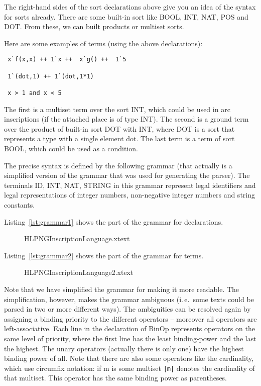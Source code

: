 The right-hand sides of the sort declarations above give you an idea of the
syntax for sorts already. There are some built-in sort like BOOL, INT, NAT, POS and
DOT. From these, we can built products or multiset sorts.

Here are some examples of terms (using the above declarations):
\begin{verbatim}
 x`f(x,x) ++ 1`x ++  x`g() ++  1`5
 
 1`(dot,1) ++ 1`(dot,1*1)
 
 x > 1 and x < 5 
\end{verbatim}
The first is a multiset term over the sort INT, which could be used in
arc inscriptions (if the attached place is of type INT). The second is
a ground term over the product of built-in sort DOT with INT, where DOT is
a sort that represents a type with a single element dot. The last term
is a term of sort BOOL, which could be used as a condition.

The precise syntax is defined by the following grammar (that actually is
a simplified version of the grammar that was used for generating the parser).
The terminals ID, INT, NAT, STRING in this grammar represent legal identifiers
and legal representations of integer numbers, non-negative integer numbers
and string constants.

Listing~\ref{lst:grammar1} shows the part of the grammar for declarations.
\begin{figure}[htbp!]
%
  {HLPNGInscriptionLanguage.xtext}
\end{figure} 
%
Listing~\ref{lst:grammar2} shows the part of the grammar for terms.
\begin{figure}[htbp!]
%
  {HLPNGInscriptionLanguage2.xtext}
\end{figure}
Note that we have simplified the grammar for making it more readable. The
simplification, however, makes the grammar ambiguous (i.\,e.\ some texts could be
parsed in two or more different ways). The ambiguities can be resolved again by
assigning a binding priority to the different operators -- moreover all operators are left-associative.
Each line in the declaration of BinOp represents operators on the same
level of priority, where the first line has the least binding-power and
the last the highest. The unary operators (actually there is only one) have the
highest binding power of all. Note that there are also some operators like the
cardinality, which use circumfix notation: if m is some multiset  \verb+|m|+
denotes the cardinality of that multiset. This operator has the same binding
power as parentheses.


